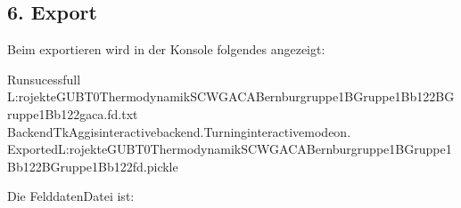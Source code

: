 \documentclass[letterpaper,10pt,english]{sphinxmanual}
\begin{document}
\subsection{6. Export}
\label{\detokenize{source/Input:export}}
\begin{sphinxVerbatim}[commandchars=\\\{\},numbers=left,firstnumber=1,stepnumber=1]
      
     
 
\end{sphinxVerbatim}

\sphinxAtStartPar
Beim exportieren wird in der Konsole folgendes angezeigt:

\begin{sphinxVerbatim}[commandchars=\\\{\}]
Runsucessfull
L:rojekteG\PYGZhy{}UBT0\PYGZus{}ThermodynamikSCW\PYGZus{}GACA\PYGZus{}Bernburgruppe1B\PYGZus{}Gruppe1\PYGZus{}Bb122B\PYGZus{}Gruppe1\PYGZus{}Bb122\PYGZus{}gaca.fd.txt
BackendTkAggisinteractivebackend.Turninginteractivemodeon.
ExportedL:rojekteG\PYGZhy{}UBT0\PYGZus{}ThermodynamikSCW\PYGZus{}GACA\PYGZus{}Bernburgruppe1B\PYGZus{}Gruppe1\PYGZus{}Bb122B\PYGZus{}Gruppe1\PYGZus{}Bb122\PYGZus{}fd.pickle
\end{sphinxVerbatim}

\sphinxAtStartPar
Die Felddaten\sphinxhyphen{}Datei  ist:
\end{document}
